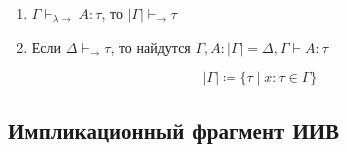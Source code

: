 
\begin{theorem}\itemfix
    \begin{enumerate}
        \item \(\Gamma \vdash_{\lambda \to } A : \tau\), то \(|\Gamma| \vdash_{\to} \tau\)
        \item Если \(\Delta \vdash_{\to} \tau\), то найдутся \(\Gamma, A : |\Gamma| = \Delta, \Gamma \vdash A : \tau\)
    \end{enumerate}
\end{theorem}

\begin{definition}
    \[|\Gamma| \coloneqq \{\tau \mid x : \tau \in \Gamma\}\]
\end{definition}

\subsection{Импликационный фрагмент ИИВ}

